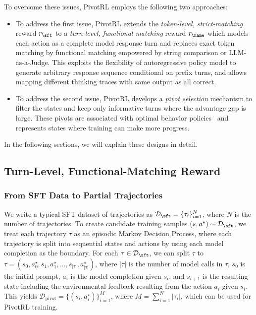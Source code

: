 To overcome these issues, PivotRL employs the following two approaches:
\begin{itemize}
    \item To address the first issue, PivotRL extends the \emph{token-level, strict-matching} reward $r_{\sft}$ to a \emph{turn-level, functional-matching} reward $r_{\name}$ which models each action as a complete model response turn and replaces exact token matching by functional matching empowered by string comparison or LLM-as-a-Judge. This exploits the flexibility of autoregressive policy model to generate arbitrary response sequence conditional on prefix turns, and allows mapping different thinking traces with same output as all correct.
    \item To address the second issue, PivotRL develops a \emph{pivot selection} mechanism to filter the states and keep only informative turns where the advantage gap is large. These pivots are associated with optimal behavior policies~\citep{papini2024policy} and represents states where training can make more progress.
\end{itemize}
In the following sections, we will explain these designs in detail.

\subsection{Turn-Level, Functional-Matching Reward}

\subsubsection{From SFT Data to Partial Trajectories}

We write a typical SFT dataset of trajectories as $\mathcal{D}_{\sft} = \{ \tau_i \}_{i=1}^N$, where $N$ is the number of trajectories. 
To create candidate training samples $(s, a^\star) \sim \mathcal{D}_{\sft}$, we treat each trajectory $\tau$ as an episodic Markov Decision Process, where each trajectory is split into sequential states and actions by using each model completion as the boundary. For each $\tau \in \mathcal{D}_\sft$, we can split $\tau$ to $\tau = (s_0, a_0^\star, s_1, a_1^\star, \dots, s_{|\tau|}, a_{|\tau|}^\star)$, where $|\tau|$ is the number of model calls in $\tau$, $s_0$ is the initial prompt, $a_i$ is the model completion given $s_i$, and $s_{i+1}$ is the resulting state including the environmental feedback resulting from the action $a_i$ given $s_i$. This yields $\mathcal{D}_{\text{pivot}} = \{ (s_i, a_i^\star) \}_{i=1}^M$, where $M = \sum_{i=1}^N |\tau_i|$, which can be used for PivotRL training.

